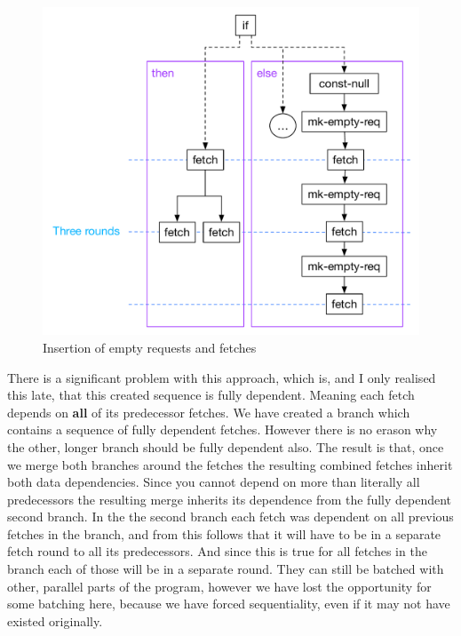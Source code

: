 \begin{figure}
    \includegraphics[width=\linewidth]{../Figures/if-insert-empty-parallel-after-insert}
    \caption{Insertion of empty requests and fetches}
    \label{if-insert-empty-parallel-after-insert}
\end{figure}

There is a significant problem with this approach, which is, and I only realised this late, that this created sequence is fully dependent.
Meaning each fetch depends on \textbf{all} of its predecessor fetches.
We have created a branch which contains a sequence of fully dependent fetches.
However there is no erason why the other, longer branch should be fully dependent also.
The result is that, once we merge both branches around the fetches the resulting combined fetches inherit both data dependencies.
Since you cannot depend on more than literally all predecessors the resulting merge inherits its dependence from the fully dependent second branch.
In the the second branch each fetch was dependent on all previous fetches in the branch, and from this follows that it will have to be in a separate fetch round to all its predecessors.
And since this is true for all fetches in the branch each of those will be in a separate round.
They can still be batched with other, parallel parts of the program, however we have lost the opportunity for some batching here, because we have forced sequentiality, even if it may not have existed originally.


